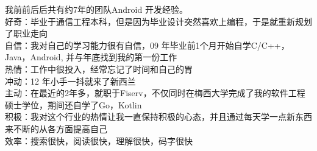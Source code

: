 
\begin{cvparagraph}
我前前后后共有约7年的团队Android 开发经验。\\
好奇：毕业于通信工程本科，但是因为毕业设计突然喜欢上编程，于是就重新规划了职业走向\\
自信：我对自己的学习能力很有自信，09 年毕业前1个月开始自学C/C++，Java，Android, 并与年底找到我的第一份工作\\
热情：工作中很投入，经常忘记了时间和自己的胃\\
冲动：12 年小手一抖就来了新西兰\\
主动：在最近的2年多，就职于Fiserv，不仅同时在梅西大学完成了我的软件工程硕士学位，期间还自学了Go，Kotlin\\
积极：我对这个行业的热情让我一直保持积极的心态，并且通过每天学一点新东西来不断的从各方面提高自己\\
效率：搜索很快，阅读很快，理解很快，码字很快
\end{cvparagraph}


